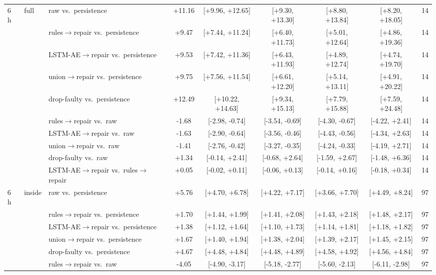 \begin{longtable}{lllcccccc}
\midrule
6 h & full & raw vs.\ persistence & +11.16 & [+9.96, +12.65] & [+9.30, +13.30] & [+8.80, +13.84] & [+8.20, +18.05] & 14 \\
 &  & rules$\rightarrow$repair vs.\ persistence & +9.47 & [+7.44, +11.24] & [+6.40, +11.73] & [+5.01, +12.64] & [+4.86, +19.36] & 14 \\
 &  & LSTM-AE$\rightarrow$repair vs.\ persistence & +9.53 & [+7.42, +11.36] & [+6.43, +11.93] & [+4.89, +12.74] & [+4.74, +19.70] & 14 \\
 &  & union$\rightarrow$repair vs.\ persistence & +9.75 & [+7.56, +11.54] & [+6.61, +12.20] & [+5.14, +13.11] & [+4.91, +20.22] & 14 \\
 &  & drop-faulty vs.\ persistence & +12.49 & [+10.22, +14.63] & [+9.34, +15.13] & [+7.79, +15.88] & [+7.59, +24.48] & 14 \\
 &  & rules$\rightarrow$repair vs.\ raw & -1.68 & [-2.98, -0.74] & [-3.54, -0.69] & [-4.30, -0.67] & [-4.22, +2.41] & 14 \\
 &  & LSTM-AE$\rightarrow$repair vs.\ raw & -1.63 & [-2.90, -0.64] & [-3.56, -0.46] & [-4.43, -0.56] & [-4.34, +2.63] & 14 \\
 &  & union$\rightarrow$repair vs.\ raw & -1.41 & [-2.76, -0.42] & [-3.27, -0.35] & [-4.24, -0.33] & [-4.19, +2.71] & 14 \\
 &  & drop-faulty vs.\ raw & +1.34 & [-0.14, +2.41] & [-0.68, +2.64] & [-1.59, +2.67] & [-1.48, +6.36] & 14 \\
 &  & LSTM-AE$\rightarrow$repair vs.\ rules$\rightarrow$repair & +0.05 & [-0.02, +0.11] & [-0.06, +0.13] & [-0.14, +0.16] & [-0.18, +0.34] & 14 \\
\midrule
6 h & inside & raw vs.\ persistence & +5.76 & [+4.70, +6.78] & [+4.22, +7.17] & [+3.66, +7.70] & [+4.49, +8.24] & 97 \\
 &  & rules$\rightarrow$repair vs.\ persistence & +1.70 & [+1.44, +1.99] & [+1.41, +2.08] & [+1.43, +2.18] & [+1.48, +2.17] & 97 \\
 &  & LSTM-AE$\rightarrow$repair vs.\ persistence & +1.38 & [+1.12, +1.64] & [+1.10, +1.73] & [+1.14, +1.81] & [+1.18, +1.82] & 97 \\
 &  & union$\rightarrow$repair vs.\ persistence & +1.67 & [+1.40, +1.94] & [+1.38, +2.04] & [+1.39, +2.17] & [+1.45, +2.15] & 97 \\
 &  & drop-faulty vs.\ persistence & +4.67 & [+4.48, +4.84] & [+4.48, +4.89] & [+4.58, +4.92] & [+4.56, +4.84] & 97 \\
 &  & rules$\rightarrow$repair vs.\ raw & -4.05 & [-4.90, -3.17] & [-5.18, -2.77] & [-5.60, -2.13] & [-6.11, -2.98] & 97 \\

\end{longtable}
